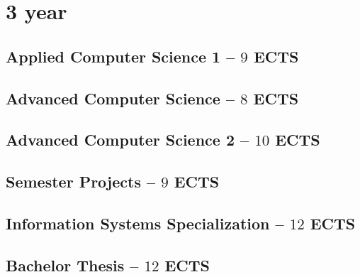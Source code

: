 \documentclass[11pt]{article}
\newcommand{\module}[2]{
    \subsection{#1 \small -- $#2$ ECTS}
}
\begin{document}
%
%
\section{3 year}
\module{Applied Computer Science 1}{9}
\pagebreak

\module{Advanced Computer Science}{8}
\pagebreak
\module{Advanced Computer Science 2}{10}
\pagebreak
\pagebreak

\module{Semester Projects}{9}
\module{Information Systems Specialization}{12}
\pagebreak
\module{Bachelor Thesis}{12}
\end{document}
